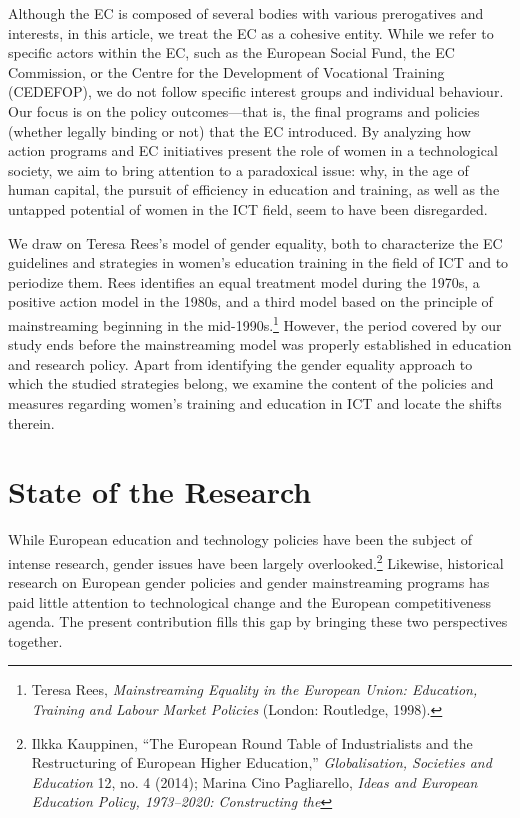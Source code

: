 \documentclass{tufte-handout}
\begin{document}
Although the EC is composed of several bodies with various prerogatives
and interests, in this article, we treat the EC as a cohesive entity.
While we refer to specific actors within the EC, such as the European
Social Fund, the EC Commission, or the Centre for the Development of
Vocational Training (CEDEFOP), we do not follow specific interest groups
and individual behaviour. Our focus is on the policy outcomes---that is,
the final programs and policies (whether legally binding or not) that
the EC introduced. By analyzing how action programs and EC initiatives
present the role of women in a technological society, we aim to bring
attention to a paradoxical issue: why, in the age of human capital, the
pursuit of efficiency in education and training, as well as the untapped
potential of women in the ICT field, seem to have been disregarded.

We draw on Teresa Rees's model of gender equality, both to characterize
the EC guidelines and strategies in women's education training in the
field of ICT and to periodize them. Rees identifies an equal treatment
model during the 1970s, a positive action model in the 1980s, and a
third model based on the principle of mainstreaming beginning in the
mid-1990s.\footnote{Teresa Rees, \emph{Mainstreaming Equality in the
  European Union: Education, Training and Labour Market Policies}
  (London: Routledge, 1998).} However, the period covered by our study
ends before the mainstreaming model was properly established in
education and research policy. Apart from identifying the gender
equality approach to which the studied strategies belong, we examine the
content of the policies and measures regarding women's training and
education in ICT and locate the shifts therein.

\hypertarget{state-of-the-research}{%
\section{State of the Research}\label{state-of-the-research}}

While European education and technology policies have been the subject
of intense research, gender issues have been largely
overlooked.\footnote{Ilkka Kauppinen, ``The European Round Table of
  Industrialists and the Restructuring of European Higher Education,''
  \emph{Globalisation, Societies and Education} 12, no. 4 (2014); Marina
  Cino Pagliarello, \emph{Ideas and European Education Policy,
  1973--2020: Constructing the}} Likewise, historical research on European gender policies and
gender mainstreaming programs has paid little attention to technological
change and the European competitiveness agenda. The present contribution
fills this gap by bringing these two perspectives together.
\end{document}
